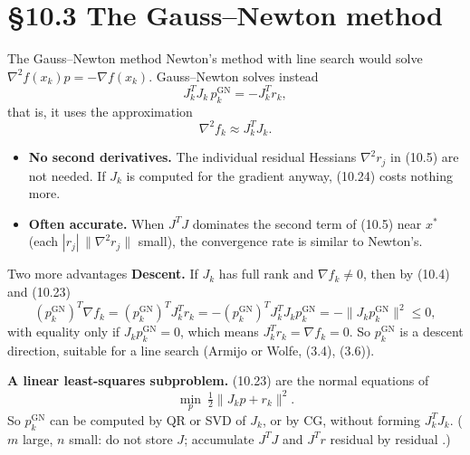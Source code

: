 \documentclass[aspectratio=169,12pt]{beamer}
\newcommand{\xs}{x^{*}}
\newcommand{\gradf}{\nabla f}
\newcommand{\hessf}{\nabla^{2} f}
\newcommand{\GN}{\mathrm{GN}}
\newcommand{\eqn}[1]{\text{\small(#1)}}
\begin{document}
\section{\S10.3 The Gauss--Newton method}

\begin{frame}{The Gauss--Newton method}
  Newton's method with line search would solve $\hessf(x_{k})p=-\gradf(x_{k})$.
  Gauss--Newton solves instead
  \[ J_{k}^{T}J_{k}\,p_{k}^{\GN}=-J_{k}^{T}r_{k}, \tag{10.23} \]
  that is, it uses the approximation
  \[ \hessf_{k}\approx J_{k}^{T}J_{k} . \tag{10.24} \]

  \begin{itemize}\setlength\itemsep{0.4em}
    \item \textbf{No second derivatives.} The individual residual Hessians $\nabla^{2}r_{j}$ in (10.5)
      are not needed. If $J_{k}$ is computed for the gradient anyway, (10.24) costs nothing more.
    \item \textbf{Often accurate.} When $J^{T}J$ dominates the second term of (10.5) near $\xs$
      (each $|r_{j}|\,\|\nabla^{2}r_{j}\|$ small), the convergence rate is similar to Newton's.
  \end{itemize}
\end{frame}

\begin{frame}{Two more advantages}
  \textbf{Descent.} If $J_{k}$ has full rank and $\gradf_{k}\ne 0$, then by (10.4) and (10.23)
  \[
    (p_{k}^{\GN})^{T}\gradf_{k}=(p_{k}^{\GN})^{T}J_{k}^{T}r_{k}=-(p_{k}^{\GN})^{T}J_{k}^{T}J_{k}p_{k}^{\GN}=-\|J_{k}p_{k}^{\GN}\|^{2}\le 0 ,
    \tag{10.25}
  \]
  with equality only if $J_{k}p_{k}^{\GN}=0$, which means $J_{k}^{T}r_{k}=\gradf_{k}=0$.
  So $p_{k}^{\GN}$ is a descent direction, suitable for a line search (Armijo or Wolfe, (3.4), (3.6)).

  \vspace{0.4em}
  \textbf{A linear least-squares subproblem.} (10.23) are the normal equations of
  \[ \min_{p}\ \tfrac12\|J_{k}p+r_{k}\|^{2} . \tag{10.26} \]
  So $p_{k}^{\GN}$ can be computed by QR or SVD of $J_{k}$, or by CG, \alert{without forming $J_{k}^{T}J_{k}$}.
  ($m$ large, $n$ small: do not store $J$; accumulate $J^{T}J$ and $J^{T}r$ residual by residual \eqn{10.27}.)
\end{frame}
\end{document}
